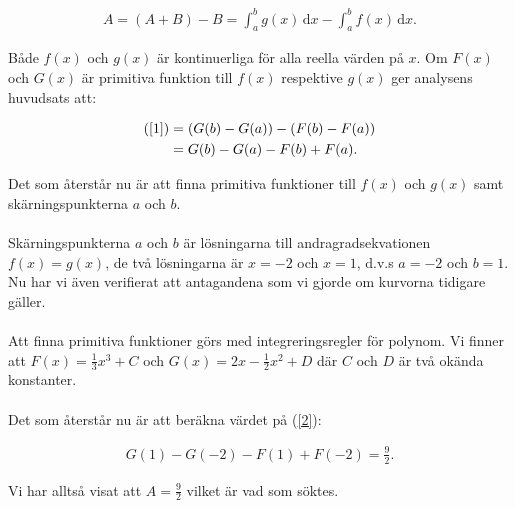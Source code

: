\documentclass{article}
\begin{document}
\begin{gather}
  A = (A + B) - B = \int_{a}^{b} g(x) \,\mathrm{d}x - \int_{a}^{b} f(x) \,\mathrm{d}x\text{.} \label{1}
\end{gather}

\noindent Både $f(x)$ och $g(x)$ är kontinuerliga för alla reella värden på $x$. Om $F(x)$ och $G(x)$ är primitiva funktion till $f(x)$ respektive $g(x)$ ger analysens huvudsats att:

\begin{align}
  \text{(\ref{1})} &= (G(b) - G(a)) - (F(b) - F(a)) \notag\\
  &= G(b) - G(a) - F(b) + F(a)\text{.} \label{2}
\end{align}

\noindent Det som återstår nu är att finna primitiva funktioner till $f(x)$ och $g(x)$ samt skärningspunkterna $a$ och $b$.
\\
\\
\noindent Skärningspunkterna $a$ och $b$ är lösningarna till andragradsekvationen $f(x) = g(x)$, de två lösningarna är $x = -2$ och $x = 1$, d.v.s $a = -2$ och $b = 1$. Nu har vi även verifierat att antagandena som vi gjorde om kurvorna tidigare gäller.
\\
\\
\noindent Att finna primitiva funktioner görs med integreringsregler för polynom. Vi finner att $F(x) =\tfrac{1}{3}x^{3} + C$ och $G(x) = 2x - \tfrac{1}{2}x^{2} + D$ där $C$ och $D$ är två okända konstanter.
\\
\\
\noindent Det som återstår nu är att beräkna värdet på (\ref{2}):

\begin{gather*}
  G(1) - G(-2) - F(1) + F(-2) = \frac{9}{2}\text{.}
\end{gather*}

\noindent Vi har alltså visat att $A = \frac{9}{2}$ vilket är vad som söktes.
\\
\\

\centering{$\qed$}
\end{document}

